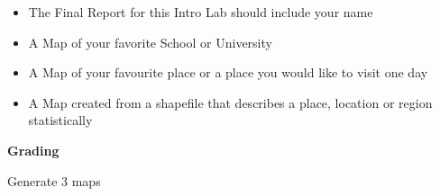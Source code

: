 \documentclass{article}
\begin{document}
\begin{itemize}

\item The Final Report for this Intro Lab should include your name
\item A Map of your favorite School or University
\item A Map of your favourite place or a place you would like to visit one day
\item A Map created from a shapefile that describes a place, location or region statistically

\end{itemize}


\setlength{\leftskip}{0cm}

\textbf{Grading}

\vspace{4mm}

\setlength{\leftskip}{1cm}

\setlength{\parindent}{0cm}

Generate 3 maps

\end{document}
